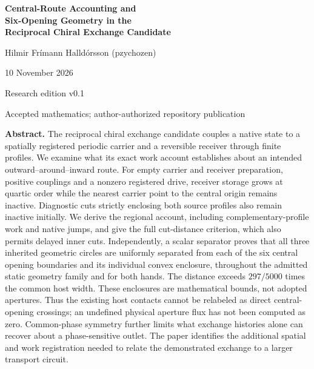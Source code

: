 \documentclass[11pt,a4paper]{article}
\numberwithin{equation}{section}
\theoremstyle{remark}\newtheorem{remark}[theorem]{Remark}
\begin{document}
\hypersetup{pageanchor=false}
\begin{titlepage}
\centering
\vspace*{17mm}
{\LARGE\bfseries Central-Route Accounting and\\[3mm] Six-Opening Geometry in the\\[3mm] Reciprocal Chiral Exchange Candidate\par}
\vspace{11mm}
{\large Hilmir Frímann Halldórsson (pzychozen)\par}
\vspace{4mm}
{10 November 2026\par}
\vspace{5mm}
{\small Research edition v0.1\par
Accepted mathematics; author-authorized repository publication\par}
\vspace{10mm}
\begin{minipage}{0.94\textwidth}
\textbf{Abstract.}
The reciprocal chiral exchange candidate couples a native state to a spatially registered periodic carrier and a reversible receiver through finite profiles. We examine what its exact work account establishes about an intended outward--around--inward route. For empty carrier and receiver preparation, positive couplings and a nonzero registered drive, receiver storage grows at quartic order while the nearest carrier point to the central origin remains inactive. Diagnostic cuts strictly enclosing both source profiles also remain inactive initially. We derive the regional account, including complementary-profile work and native jumps, and give the full cut-distance criterion, which also permits delayed inner cuts. Independently, a scalar separator proves that all three inherited geometric circles are uniformly separated from each of the six central opening boundaries and its individual convex enclosure, throughout the admitted static geometry family and for both hands. The distance exceeds $297/5000$ times the common host width. These enclosures are mathematical bounds, not adopted apertures. Thus the existing host contacts cannot be relabeled as direct central-opening crossings; an undefined physical aperture flux has not been computed as zero. Common-phase symmetry further limits what exchange histories alone can recover about a phase-sensitive outlet. The paper identifies the additional spatial and work registration needed to relate the demonstrated exchange to a larger transport circuit.
\end{minipage}

\end{titlepage}
\end{document}
